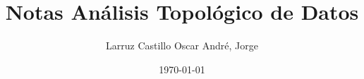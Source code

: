 \author{Larruz Castillo Oscar André, Jorge}
\title{Notas Análisis Topológico de Datos}
\date{\today}

\frontmatter
\maketitle
